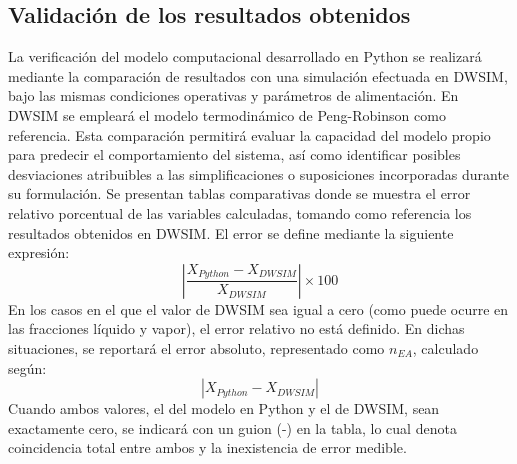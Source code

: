 \subsection{Validación de los resultados obtenidos}
La verificación del modelo computacional desarrollado en Python se realizará mediante la comparación de resultados con una simulación efectuada en DWSIM, bajo las mismas condiciones operativas y parámetros de alimentación. En DWSIM se empleará el modelo termodinámico de Peng-Robinson como referencia. Esta comparación permitirá evaluar la capacidad del modelo propio para predecir el comportamiento del sistema, así como identificar posibles desviaciones atribuibles a las simplificaciones o suposiciones incorporadas durante su formulación.
\nsp{1em}
Se presentan tablas comparativas donde se muestra el error relativo porcentual de las variables calculadas, tomando como referencia los resultados obtenidos en DWSIM. El error se define mediante la siguiente expresión:
$$
    \left| \frac{X_{Python} - X_{DWSIM}}{X_{DWSIM}} \right| \times 100
$$
En los casos en el que el valor de DWSIM sea igual a cero (como puede ocurre en las fracciones líquido y vapor), el error relativo no está definido. En dichas situaciones, se reportará el error absoluto, representado como $n_{EA}$, calculado según:
$$
    \left| X_{Python} - X_{DWSIM} \right|
$$
Cuando ambos valores, el del modelo en Python y el de DWSIM, sean exactamente cero, se indicará con un guion (-) en la tabla, lo cual denota coincidencia total entre ambos y la inexistencia de error medible.

\newpage

